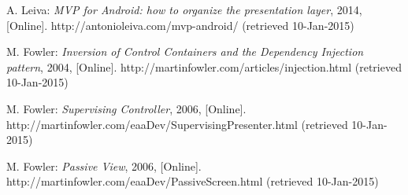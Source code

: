 \begin{thebibliography}{1}
A. Leiva: \emph{MVP for Android: how to organize the presentation layer}, 2014, 
[Online]. http://antonioleiva.com/mvp-android/ (retrieved 10-Jan-2015)

M. Fowler: \emph{Inversion of Control Containers and the Dependency Injection pattern}, 2004, 
[Online]. http://martinfowler.com/articles/injection.html (retrieved 10-Jan-2015)

M. Fowler: \emph{Supervising Controller}, 2006, 
[Online]. http://martinfowler.com/eaaDev/SupervisingPresenter.html (retrieved 10-Jan-2015)

M. Fowler: \emph{Passive View}, 2006, 
[Online]. http://martinfowler.com/eaaDev/PassiveScreen.html (retrieved 10-Jan-2015)

\end{thebibliography}